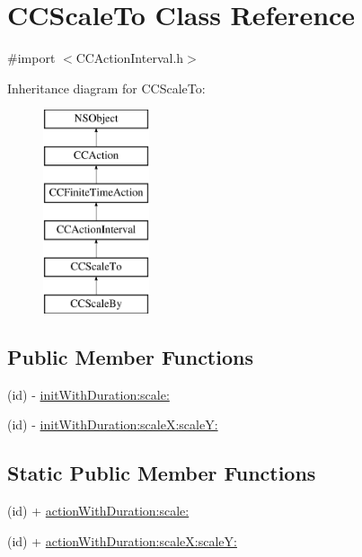 \hypertarget{interface_c_c_scale_to}{\section{C\-C\-Scale\-To Class Reference}
\label{interface_c_c_scale_to}
}


{\ttfamily \#import $<$C\-C\-Action\-Interval.\-h$>$}

Inheritance diagram for C\-C\-Scale\-To\-:\begin{figure}[H]
\begin{center}
\leavevmode
\includegraphics[height=6.000000cm]{interface_c_c_scale_to}
\end{center}
\end{figure}
\subsection*{Public Member Functions}
\begin{DoxyCompactItemize}
\item 
(id) -\/ \hyperlink{interface_c_c_scale_to_a9dc30fcec55edd72f339aa3709ae7361}{init\-With\-Duration\-:scale\-:}
\item 
(id) -\/ \hyperlink{interface_c_c_scale_to_a0c7f0b0b6a9b5f2fbdc9452df9e3e6c4}{init\-With\-Duration\-:scale\-X\-:scale\-Y\-:}
\end{DoxyCompactItemize}
\subsection*{Static Public Member Functions}
\begin{DoxyCompactItemize}
\item 
(id) + \hyperlink{interface_c_c_scale_to_af7f0258bf243c89963c22b9ad70acb67}{action\-With\-Duration\-:scale\-:}
\item 
(id) + \hyperlink{interface_c_c_scale_to_a7ca94dd7c0608b30e0b8d828fdd0d1c7}{action\-With\-Duration\-:scale\-X\-:scale\-Y\-:}
\end{DoxyCompactItemize}
